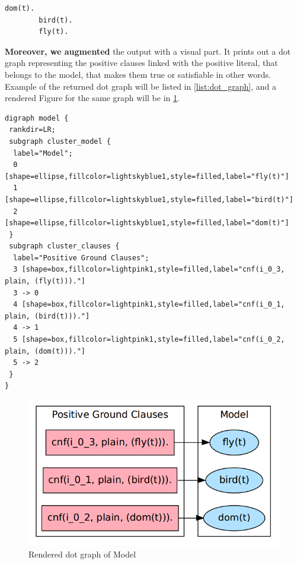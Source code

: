 		
			\begin{minipage}{\textwidth}
			\begin{lstlisting}[caption=Example for the returned Model,label={list:model_example},frame=single]
		dom(t).
		bird(t).
		fly(t).
			\end{lstlisting} 
			\end{minipage}						
		
		
		\textbf{Moreover, we augmented} the output with a visual part. It prints out a dot graph representing the positive clauses linked with the positive literal, that belongs to the model, that makes them true or satisfiable in other words. Example of the returned dot graph will be listed in \ref{list:dot_graph}, and a rendered Figure for the same graph will be in \ref{fig:dot_graph}.
		
			\begin{minipage}{\textwidth}
			\begin{lstlisting}[caption=Example of returned dot graph,label={list:dot_graph},breaklines=true,frame=single]
digraph model {
 rankdir=LR;
 subgraph cluster_model {
  label="Model"; 
  0 [shape=ellipse,fillcolor=lightskyblue1,style=filled,label="fly(t)"]
  1 [shape=ellipse,fillcolor=lightskyblue1,style=filled,label="bird(t)"]
  2 [shape=ellipse,fillcolor=lightskyblue1,style=filled,label="dom(t)"]
 }
 subgraph cluster_clauses {
  label="Positive Ground Clauses"; 
  3 [shape=box,fillcolor=lightpink1,style=filled,label="cnf(i_0_3, plain, (fly(t)))."]
  3 -> 0
  4 [shape=box,fillcolor=lightpink1,style=filled,label="cnf(i_0_1, plain, (bird(t)))."]
  4 -> 1
  5 [shape=box,fillcolor=lightpink1,style=filled,label="cnf(i_0_2, plain, (dom(t)))."]
  5 -> 2
 }
}
			\end{lstlisting} 
			\end{minipage}						

						
			\begin{figure}[H]
				\centering
				\includegraphics[scale=0.42]{pictures/dot_graph.png}
				\caption{Rendered dot graph of Model\label{fig:dot_graph}}
			\end{figure}
		